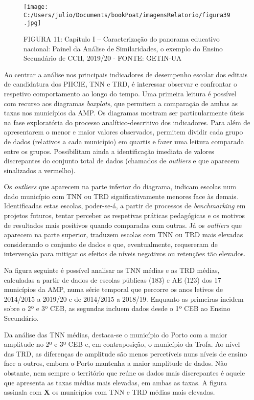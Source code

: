 \documentclass[
]{book}
\begin{document}
\begin{figure}
\centering
\texttt{[image: C:/Users/julio/Documents/bookPoat/imagensRelatorio/figura39.jpg]}
\caption{FIGURA 11: Capítulo I -- Caracterização do panorama educativo nacional: Painel da Análise de Similaridades, o exemplo do Ensino Secundário de CCH, 2019/20 - FONTE: GETIN-UA}
\end{figure}

Ao centrar a análise nos principais indicadores de desempenho escolar dos editais de candidatura dos PIICIE, TNN e TRD, é interessar observar e confrontar o respetivo comportamento ao longo do tempo. Uma primeira leitura é possível com recurso aos diagramas \emph{boxplots}, que permitem a comparação de ambas as taxas nos municípios da AMP. Os diagramas mostram ser particularmente úteis na fase exploratória do processo analítico-descritivo dos indicadores. Para além de apresentarem o menor e maior valores observados, permitem dividir cada grupo de dados (relativos a cada município) em quartis e fazer uma leitura comparada entre os grupos. Possibilitam ainda a identificação imediata de valores discrepantes do conjunto total de dados (chamados de \emph{outliers} e que aparecem sinalizados a vermelho).

Os \emph{outliers} que aparecem na parte inferior do diagrama, indicam escolas num dado município com TNN ou TRD significativamente menores face às demais. Identificadas estas escolas, poder-se-á, a partir de processos de \emph{benchmarking} em projetos futuros, tentar perceber as respetivas práticas pedagógicas e os motivos de resultados mais positivos quando comparadas com outras. Já os \emph{outliers} que aparecem na parte superior, traduzem escolas com TNN ou TRD mais elevadas considerando o conjunto de dados e que, eventualmente, requereram de intervenção para mitigar os efeitos de níveis negativos ou retenções tão elevados.

Na figura seguinte é possível analisar as TNN médias e as TRD médias, calculadas a partir de dados de escolas públicas (183) e AE (123) dos 17 municípios da AMP, numa série temporal que percorre os anos letivos de 2014/2015 a 2019/20 e de 2014/2015 a 2018/19. Enquanto as primeiras incidem sobre o 2º e 3º CEB, as segundas incluem dados desde o 1º CEB ao Ensino Secundário.

Da análise das TNN médias, destaca-se o município do Porto com a maior amplitude no 2º e 3º CEB e, em contraposição, o município da Trofa. Ao nível das TRD, as diferenças de amplitude são menos percetíveis nuns níveis de ensino face a outros, embora o Porto mantenha a maior amplitude de dados. Não obstante, nem sempre o território que reúne os dados mais discrepantes é aquele que apresenta as taxas médias mais elevadas, em ambas as taxas. A figura assinala com \textbf{X} os municípios com TNN e TRD médias mais elevadas.
\end{document}

